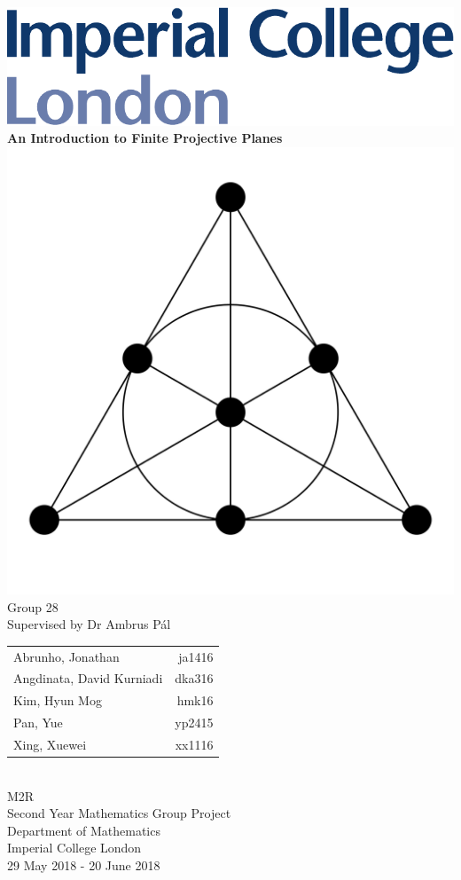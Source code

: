 \documentclass{report}
\theoremstyle{definition}\newtheorem*{definition}{Definition}
\theoremstyle{definition}\newtheorem*{example}{Example}
\theoremstyle{remark}\newtheorem*{remark}{Remark}
\begin{document}
\begin{titlepage}
\begin{center}
\vspace{1cm}
\includegraphics[scale=0.2]{figures/imperial.pdf} \\
\vspace{1cm}
\textbf{\Large An Introduction to Finite Projective Planes} \\
\vspace{2cm}
\includegraphics[scale=0.2]{figures/order_2.jpg}
\vfill
Group 28 \\
\vspace{1cm}
Supervised by Dr Ambrus Pál \\
\vspace{1cm}
\begin{tabular}{lr}
Abrunho, Jonathan & ja1416 \\
Angdinata, David Kurniadi & dka316 \\
Kim, Hyun Mog & hmk16 \\
Pan, Yue & yp2415 \\
Xing, Xuewei & xx1116 \\
\end{tabular}
\vspace{1cm} \\
M2R \\
Second Year Mathematics Group Project \\
Department of Mathematics \\
Imperial College London \\
29 May 2018 - 20 June 2018
\end{center}
\end{titlepage}
\end{document}
